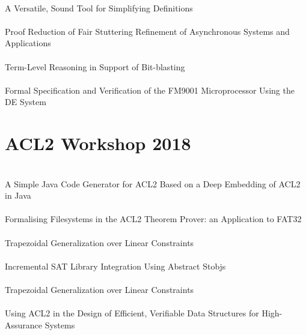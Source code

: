 \documentclass{article}
\begin{document}
\cite{17-coglio-simplify} \\
A Versatile, Sound Tool for Simplifying Definitions \\

\cite{17-sumners-refinement} \\
Proof Reduction of Fair Stuttering Refinement of Asynchronous Systems and Applications \\

\cite{17-swords-blasting} \\
Term-Level Reasoning in Support of Bit-blasting \\

\cite{17-chau-de} \\
Formal Specification and Verification of the {FM9001} Microprocessor Using the {DE} System \\


\section{ACL2 Workshop 2018}

\cite{18-coglio-java} \\
A Simple Java Code Generator for {ACL2} Based on a Deep Embedding of {ACL2} in Java \\

\cite{18-mehta-filesystems} \\
Formalising Filesystems in the {ACL2} Theorem Prover: an Application to {FAT32} \\

\cite{18-greve-generalization} \\
Trapezoidal Generalization over Linear Constraints \\

\cite{18-swords-sat} \\
Incremental {SAT} Library Integration Using Abstract Stobjs \\

\cite{18-hardin-data-structures} \\
Trapezoidal Generalization over Linear Constraints \\

\cite{18-hardin-data-structures} \\
Using {ACL2} in the Design of Efficient, Verifiable Data Structures for High-Assurance Systems \\
\end{document}
